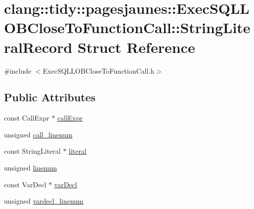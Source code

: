 \hypertarget{structclang_1_1tidy_1_1pagesjaunes_1_1_exec_s_q_l_l_o_b_close_to_function_call_1_1_string_literal_record}{}\section{clang\+:\+:tidy\+:\+:pagesjaunes\+:\+:Exec\+S\+Q\+L\+L\+O\+B\+Close\+To\+Function\+Call\+:\+:String\+Literal\+Record Struct Reference}
\label{structclang_1_1tidy_1_1pagesjaunes_1_1_exec_s_q_l_l_o_b_close_to_function_call_1_1_string_literal_record}


{\ttfamily \#include $<$Exec\+S\+Q\+L\+L\+O\+B\+Close\+To\+Function\+Call.\+h$>$}

\subsection*{Public Attributes}
\begin{DoxyCompactItemize}
\item 
const Call\+Expr $\ast$ \hyperlink{structclang_1_1tidy_1_1pagesjaunes_1_1_exec_s_q_l_l_o_b_close_to_function_call_1_1_string_literal_record_a95e76bdda8c3a944ace9e37402c77e29}{call\+Expr}
\item 
unsigned \hyperlink{structclang_1_1tidy_1_1pagesjaunes_1_1_exec_s_q_l_l_o_b_close_to_function_call_1_1_string_literal_record_abf3be6adddbd42250cea5edf8e7bfdf4}{call\+\_\+linenum}
\item 
const String\+Literal $\ast$ \hyperlink{structclang_1_1tidy_1_1pagesjaunes_1_1_exec_s_q_l_l_o_b_close_to_function_call_1_1_string_literal_record_a6ec16d8220d238549d4f28f3a8dbea7c}{literal}
\item 
unsigned \hyperlink{structclang_1_1tidy_1_1pagesjaunes_1_1_exec_s_q_l_l_o_b_close_to_function_call_1_1_string_literal_record_a65cb08b350697d078206fca78240a86f}{linenum}
\item 
const Var\+Decl $\ast$ \hyperlink{structclang_1_1tidy_1_1pagesjaunes_1_1_exec_s_q_l_l_o_b_close_to_function_call_1_1_string_literal_record_afcb245f7eb537005833bc63a5ac21bf4}{var\+Decl}
\item 
unsigned \hyperlink{structclang_1_1tidy_1_1pagesjaunes_1_1_exec_s_q_l_l_o_b_close_to_function_call_1_1_string_literal_record_ac990431f820fbb9c57c69b58a4e3b131}{vardecl\+\_\+linenum}
\end{DoxyCompactItemize}


